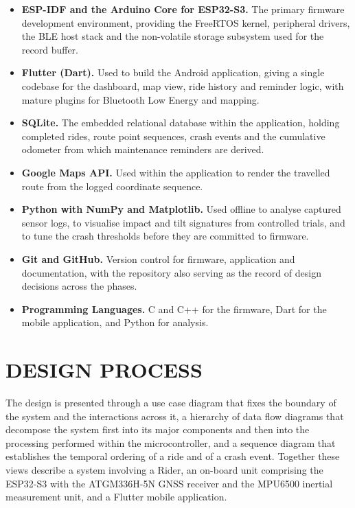 \documentclass[12pt,a4paper,oneside]{report}
\begin{document}
\begin{itemize}[leftmargin=*,itemsep=0.55em,topsep=0.6em]
\item \textbf{ESP-IDF and the Arduino Core for ESP32-S3.} The primary firmware development
environment, providing the FreeRTOS kernel, peripheral drivers, the BLE host stack and the
non-volatile storage subsystem used for the record buffer.

\item \textbf{Flutter (Dart).} Used to build the Android application, giving a single
codebase for the dashboard, map view, ride history and reminder logic, with mature plugins
for Bluetooth Low Energy and mapping.

\item \textbf{SQLite.} The embedded relational database within the application, holding
completed rides, route point sequences, crash events and the cumulative odometer from which
maintenance reminders are derived.

\item \textbf{Google Maps API.} Used within the application to render the travelled route
from the logged coordinate sequence.

\item \textbf{Python with NumPy and Matplotlib.} Used offline to analyse captured sensor
logs, to visualise impact and tilt signatures from controlled trials, and to tune the crash
thresholds before they are committed to firmware.

\item \textbf{Git and GitHub.} Version control for firmware, application and documentation,
with the repository also serving as the record of design decisions across the phases.

\item \textbf{Programming Languages.} C and C++ for the firmware, Dart for the mobile
application, and Python for analysis.
\end{itemize}

\section{DESIGN PROCESS}

The design is presented through a use case diagram that fixes the boundary of the system and
the interactions across it, a hierarchy of data flow diagrams that decompose the system
first into its major components and then into the processing performed within the
microcontroller, and a sequence diagram that establishes the temporal ordering of a ride and
of a crash event. Together these views describe a system involving a Rider, an on-board unit
comprising the ESP32-S3 with the ATGM336H-5N GNSS receiver and the MPU6500 inertial
measurement unit, and a Flutter mobile application.
\end{document}
